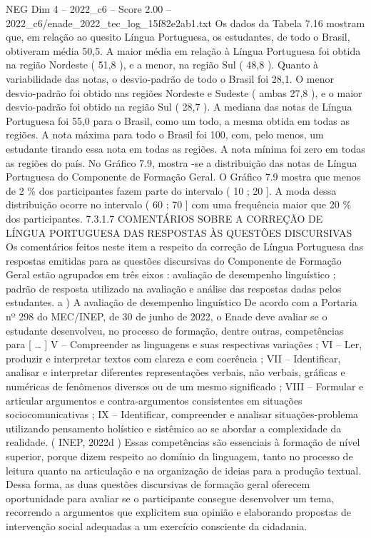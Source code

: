 \begin{textsample}{NEG Dim 4 – 2022\_c6 – Score 2.00 – 2022\_c6/enade\_2022\_tec\_log\_15f82e2ab1.txt}
Os dados da Tabela 7.16 mostram que, em relação ao quesito Língua Portuguesa, os estudantes, de todo o Brasil, obtiveram média 50,5.
A maior média em relação à Língua Portuguesa foi obtida na região Nordeste ( 51,8 ), e a menor, na região Sul ( 48,8 ).
Quanto à variabilidade das notas, o desvio-padrão de todo o Brasil foi 28,1.
O menor desvio-padrão foi obtido nas regiões Nordeste e Sudeste ( ambas 27,8 ), e o maior desvio-padrão foi obtido na região Sul ( 28,7 ).
A mediana das notas de Língua Portuguesa foi 55,0 para o Brasil, como um todo, a mesma obtida em todas as regiões.
A nota máxima para todo o Brasil foi 100, com, pelo menos, um estudante tirando essa nota em todas as regiões.
A nota mínima foi zero em todas as regiões do país.
No Gráfico 7.9, mostra -se a distribuição das notas de Língua Portuguesa do Componente de Formação Geral.
O Gráfico 7.9 mostra que menos de 2 \% dos participantes fazem parte do intervalo ( 10 ; 20 ].
A moda dessa distribuição ocorre no intervalo ( 60 ; 70 ] com uma frequência maior que 20 \% dos participantes. 7.3.1.7 COMENTÁRIOS SOBRE A CORREÇÃO DE LÍNGUA PORTUGUESA DAS RESPOSTAS ÀS QUESTÕES DISCURSIVAS Os comentários feitos neste item a respeito da correção de Língua Portuguesa das respostas emitidas para as questões discursivas do Componente de Formação Geral estão agrupados em três eixos : avaliação de desempenho linguístico ; padrão de resposta utilizado na avaliação e análise das respostas dadas pelos estudantes. a ) A avaliação de desempenho linguístico De acordo com a Portaria nº 298 do MEC/INEP, de 30 de junho de 2022, o Enade deve avaliar se o estudante desenvolveu, no processo de formação, dentre outras, competências para [ … ] V – Compreender as linguagens e suas respectivas variações ; VI – Ler, produzir e interpretar textos com clareza e com coerência ; VII – Identificar, analisar e interpretar diferentes representações verbais, não verbais, gráficas e numéricas de fenômenos diversos ou de um mesmo significado ; VIII – Formular e articular argumentos e contra-argumentos consistentes em situações sociocomunicativas ; IX – Identificar, compreender e analisar situações-problema utilizando pensamento holístico e sistêmico ao se abordar a complexidade da realidade. ( INEP, 2022d ) Essas competências são essenciais à formação de nível superior, porque dizem respeito ao domínio da linguagem, tanto no processo de leitura quanto na articulação e na organização de ideias para a produção textual.
Dessa forma, as duas questões discursivas de formação geral oferecem oportunidade para avaliar se o participante consegue desenvolver um tema, recorrendo a argumentos que explicitem sua opinião e elaborando propostas de intervenção social adequadas a um exercício consciente da cidadania.

\end{textsample}
